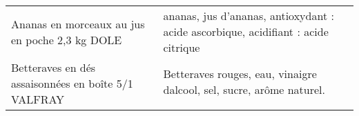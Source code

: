 \begin{longtable}{p{5cm}p{10cm}}
                                                           Ananas en morceaux au jus en poche 2,3 kg DOLE &                                                                                                                                                                                                                                                                                                                                                                                                                                                                                                                                                                                                                                                                                                                                                                                                                                                                                                                                                        ananas, jus d'ananas, antioxydant : acide ascorbique, acidifiant : acide citrique \\
                                                      Betteraves en dés assaisonnées en boîte 5/1 VALFRAY &                                                                                                                                                                                                                                                                                                                                                                                                                                                                                                                                                                                                                                                                                                                                                                                                                                                                                                                                                                    Betteraves rouges, eau, vinaigre dalcool, sel, sucre, arôme naturel. \\

\end{longtable}
